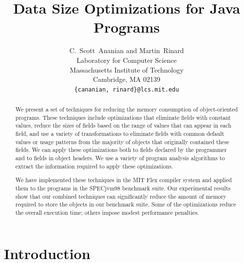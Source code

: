 \documentclass{acmconf}
\title{\bf Data Size Optimizations for Java Programs}
\author{C.~Scott~Ananian and Martin~Rinard\\
        Laboratory for Computer Science\\
        Massachusetts Institute of Technology\\ 
        Cambridge, MA 02139 \\ 
        {\tt \{cananian, rinard\}@lcs.mit.edu} }
\begin{document}


\maketitle

\begin{abstract}
We present a set of techniques for reducing the memory consumption of
object-oriented programs. These techniques 
include optimizations that eliminate fields with
constant values, reduce the sizes of fields based on the range
of values that can appear in each field, and use a variety of
transformations to eliminate fields with common default values
or usage patterns from the majority of objects that originally
contained these fields. We can apply these optimizations both 
to fields declared by the programmer and to fields in
object headers. We use a variety of program analysis 
algorithms to extract the information required to apply these
optimizations. 

We have implemented these techniques in the MIT Flex compiler
system and applied them to the programs in the SPECjvm98 
benchmark suite. Our experimental results show that 
our combined techniques can significantly reduce the amount
of memory required to store the objects in our benchmark
suite.  Some of the optimizations reduce the overall execution time;
others impose modest performance penalties.

\end{abstract}

\section{Introduction}
\end{document}
